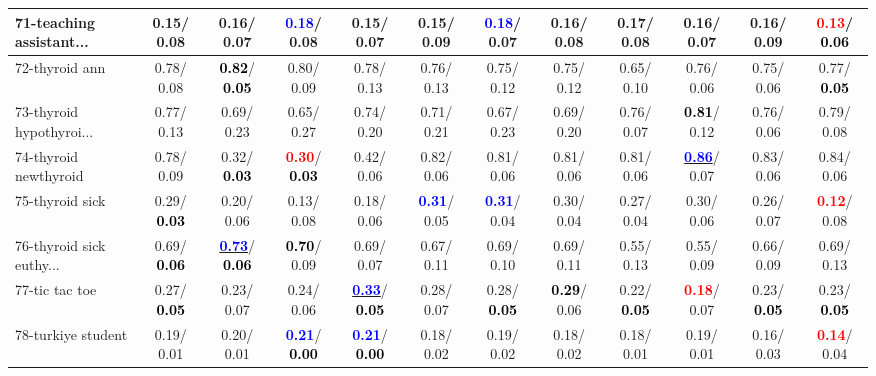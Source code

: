 \begin{table}[h]
\begin{center}
{\begin{tabular}{lc|c|c|c|c|c|c|c|c|c|c}
71-teaching assistant... &   0.15/  0.08 &   0.16/  0.07 & \textcolor{blue}{\textbf{  0.18}}/  0.08 &   0.15/  0.07 &   0.15/  0.09 & \textcolor{blue}{\textbf{  0.18}}/  0.07 &   0.16/  0.08 &   0.17/  0.08 &   0.16/  0.07 &   0.16/  0.09 & \textcolor{red}{\textbf{  0.13}}/\textcolor{black}{\textbf{  0.06}} \\ \hline
72-thyroid ann &   0.78/  0.08 & \textcolor{black}{\textbf{  0.82}}/\textcolor{black}{\textbf{  0.05}} &   0.80/  0.09 &   0.78/  0.13 &   0.76/  0.13 &   0.75/  0.12 &   0.75/  0.12 &   0.65/  0.10 &   0.76/  0.06 &   0.75/  0.06 &   0.77/\textcolor{black}{\textbf{  0.05}} \\
73-thyroid hypothyroi... &   0.77/  0.13 &   0.69/  0.23 &   0.65/  0.27 &   0.74/  0.20 &   0.71/  0.21 &   0.67/  0.23 &   0.69/  0.20 &   0.76/  0.07 & \textcolor{black}{\textbf{  0.81}}/  0.12 &   0.76/  0.06 &   0.79/  0.08 \\
74-thyroid newthyroid &   0.78/  0.09 &   0.32/\textcolor{black}{\textbf{  0.03}} & \textcolor{red}{\textbf{  0.30}}/\textcolor{black}{\textbf{  0.03}} &   0.42/  0.06 &   0.82/  0.06 &   0.81/  0.06 &   0.81/  0.06 &   0.81/  0.06 & \underline{\textcolor{blue}{\textbf{  0.86}}}/  0.07 &   0.83/  0.06 &   0.84/  0.06 \\
75-thyroid sick &   0.29/\textcolor{black}{\textbf{  0.03}} &   0.20/  0.06 &   0.13/  0.08 &   0.18/  0.06 & \textcolor{blue}{\textbf{  0.31}}/  0.05 & \textcolor{blue}{\textbf{  0.31}}/  0.04 &   0.30/  0.04 &   0.27/  0.04 &   0.30/  0.06 &   0.26/  0.07 & \textcolor{red}{\textbf{  0.12}}/  0.08 \\
76-thyroid sick euthy... &   0.69/\textcolor{black}{\textbf{  0.06}} & \underline{\textcolor{blue}{\textbf{  0.73}}}/\textcolor{black}{\textbf{  0.06}} & \textcolor{black}{\textbf{  0.70}}/  0.09 &   0.69/  0.07 &   0.67/  0.11 &   0.69/  0.10 &   0.69/  0.11 &   0.55/  0.13 &   0.55/  0.09 &   0.66/  0.09 &   0.69/  0.13 \\
77-tic tac toe &   0.27/\textcolor{black}{\textbf{  0.05}} &   0.23/  0.07 &   0.24/  0.06 & \underline{\textcolor{blue}{\textbf{  0.33}}}/\textcolor{black}{\textbf{  0.05}} &   0.28/  0.07 &   0.28/\textcolor{black}{\textbf{  0.05}} & \textcolor{black}{\textbf{  0.29}}/  0.06 &   0.22/\textcolor{black}{\textbf{  0.05}} & \textcolor{red}{\textbf{  0.18}}/  0.07 &   0.23/\textcolor{black}{\textbf{  0.05}} &   0.23/\textcolor{black}{\textbf{  0.05}} \\
78-turkiye student &   0.19/  0.01 &   0.20/  0.01 & \textcolor{blue}{\textbf{  0.21}}/\textcolor{black}{\textbf{  0.00}} & \textcolor{blue}{\textbf{  0.21}}/\textcolor{black}{\textbf{  0.00}} &   0.18/  0.02 &   0.19/  0.02 &   0.18/  0.02 &   0.18/  0.01 &   0.19/  0.01 &   0.16/  0.03 & \textcolor{red}{\textbf{  0.14}}/  0.04 \\ \hline

\end{tabular}}
\end{center}
\end{table}
